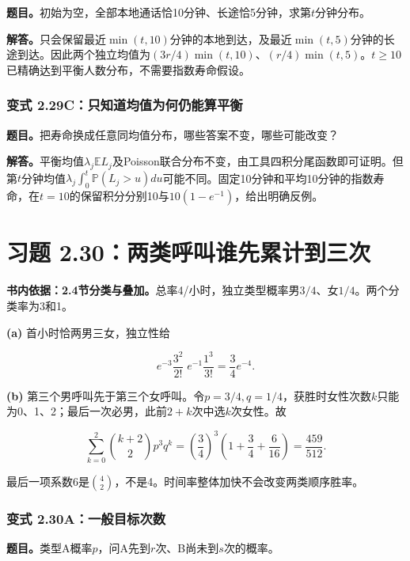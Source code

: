 \documentclass[12pt,a4paper,UTF8,fontset=fandol]{ctexart}
\begin{document}
\textbf{题目。}初始为空，全部本地通话恰10分钟、长途恰5分钟，求第\(t\)分钟分布。

\textbf{解答。}只会保留最近\(\min(t,10)\)分钟的本地到达，及最近\(\min(t,5)\)分钟的长途到达。因此两个独立均值为\((3r/4)\min(t,10)\)、\((r/4)\min(t,5)\)。\(t\ge10\)已精确达到平衡人数分布，不需要指数寿命假设。

\subsubsection{变式
2.29C：只知道均值为何仍能算平衡}\label{ux53d8ux5f0f-2.29cux53eaux77e5ux9053ux5747ux503cux4e3aux4f55ux4ecdux80fdux7b97ux5e73ux8861}

\textbf{题目。}把寿命换成任意同均值分布，哪些答案不变，哪些可能改变？

\textbf{解答。}平衡均值\(\lambda_j\mathbb EL_j\)及Poisson联合分布不变，由工具四积分尾函数即可证明。但第\(t\)分钟均值\(\lambda_j\int_0^t\mathbb P(L_j>u)du\)可能不同。固定10分钟和平均10分钟的指数寿命，在\(t=10\)的保留积分分别10与\(10(1-e^{-1})\)，给出明确反例。

\section{习题
2.30：两类呼叫谁先累计到三次}\label{ux4e60ux9898-2.30ux4e24ux7c7bux547cux53ebux8c01ux5148ux7d2fux8ba1ux5230ux4e09ux6b21}

\textbf{书内依据：2.4节分类与叠加。}总率4/小时，独立类型概率男\(3/4\)、女\(1/4\)。两个分类率为3和1。

\textbf{(a)} 首小时恰两男三女，独立性给

\[\boxed{e^{-3}\frac{3^2}{2!}\;e^{-1}\frac{1^3}{3!}=\frac34e^{-4}.}\]

\textbf{(b)}
第三个男呼叫先于第三个女呼叫。令\(p=3/4,q=1/4\)，获胜时女性次数\(k\)只能为0、1、2；最后一次必男，此前\(2+k\)次中选\(k\)次女性。故

\[\boxed{\sum_{k=0}^2\binom{k+2}{2}p^3q^k
=\left(\frac34\right)^3\left(1+\frac34+\frac6{16}\right)=\frac{459}{512}.}\]

最后一项系数6是\(\binom42\)，不是4。时间率整体加快不会改变两类顺序胜率。

\subsubsection{变式
2.30A：一般目标次数}\label{ux53d8ux5f0f-2.30aux4e00ux822cux76eeux6807ux6b21ux6570}

\textbf{题目。}类型A概率\(p\)，问A先到\(r\)次、B尚未到\(s\)次的概率。
\end{document}
